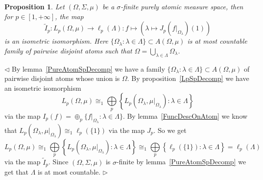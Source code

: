 \documentclass[12pt]{article}
\newtheorem{proposition}[theorem]{Proposition}
\newenvironment{proof}{\par $\triangleleft$}{$\triangleright$}
\begin{document}
\begin{proposition}\label{DescOfLpSpOnPureAtomMeasSp} Let $(\Omega,\Sigma,\mu)$
    be a $\sigma$-finite purely atomic measure space, then for 
    $p\in[1,+\infty]$, the map
    $$
        \widetilde{I}_p:L_p(\Omega,\mu)\to \ell_p(\Lambda):
        f\mapsto\left (\lambda\mapsto J_p(f|_{\Omega_\lambda})(1)\right)
    $$
    is an isometric isomorphism. Here
    $ \{\Omega_\lambda:\lambda\in\Lambda \}\subset A(\Omega,\mu)$
    is at most countable family of pairwise disjoint
    atoms such that $\Omega=\bigcup_{\lambda\in\Lambda}\Omega_\lambda$.
\end{proposition}
\begin{proof}
    By lemma~\ref{PureAtomSpDecomp} we have a family $
        \{\Omega_\lambda:\lambda\in\Lambda \}\subset A(\Omega,\mu)$ of pairwise
    disjoint atoms whose union is $\Omega$. By proposition~\ref{LpSpDecomp} we
    have an isometric isomorphism
    $$
        L_p(\Omega,\mu)
        \cong_1 \bigoplus\limits_p
        \left \{
        L_p(\Omega_\lambda,\mu|_{\Omega_\lambda}):\lambda\in\Lambda
        \right \}
    $$
    via the map $I_p(f)=\oplus_p  \{f|_{\Omega_\lambda}:\lambda\in\Lambda \}$.
    By lemma~\ref{FuncDescOnAtom} we know that
    $L_p(\Omega_\lambda,\mu|_{\Omega_\lambda})\cong_1\ell_p( \{1 \})$ via the
    map $J_p$. So we get
    $$
        L_p(\Omega,\mu)
        \cong_1 \bigoplus\limits_p \left \{
        L_p(\Omega_\lambda,\mu|_{\Omega_\lambda}):\lambda\in\Lambda
        \right \}
        \cong_1 \bigoplus\limits_p \left \{
        \ell_p( \{1 \}):\lambda\in\Lambda
        \right \}
        =\ell_p(\Lambda)
    $$
    via the map $\widetilde{I}_p$. Since $(\Omega,\Sigma,\mu)$ is
    $\sigma$-finite by lemma~\ref{PureAtomSpDecomp} we get that $\Lambda$ is at
    most countable.
\end{proof}
\end{document}
